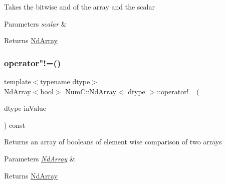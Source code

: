 Takes the bitwise and of the array and the scalar


\begin{DoxyParams}{Parameters}
{\em scalar} & \\
\hline
\end{DoxyParams}
\begin{DoxyReturn}{Returns}
\mbox{\hyperlink{class_num_c_1_1_nd_array}{Nd\+Array}} 
\end{DoxyReturn}
\mbox{\label{class_num_c_1_1_nd_array_a5fb9a63456f79ce2e828d4228f66de5a}} 
\subsubsection{\texorpdfstring{operator"!=()}{operator!=()}\hspace{0.1cm}{\footnotesize\ttfamily [1/2]}}
{\footnotesize\ttfamily template$<$typename dtype$>$ \\
\mbox{\hyperlink{class_num_c_1_1_nd_array}{Nd\+Array}}$<$bool$>$ \mbox{\hyperlink{class_num_c_1_1_nd_array}{Num\+C\+::\+Nd\+Array}}$<$ dtype $>$\+::operator!= (\begin{DoxyParamCaption}\item[{dtype}]{in\+Value }\end{DoxyParamCaption}) const\hspace{0.3cm}{\ttfamily [inline]}}

Returns an array of booleans of element wise comparison of two arrays


\begin{DoxyParams}{Parameters}
{\em \mbox{\hyperlink{class_num_c_1_1_nd_array}{Nd\+Array}}} & \\
\hline
\end{DoxyParams}
\begin{DoxyReturn}{Returns}
\mbox{\hyperlink{class_num_c_1_1_nd_array}{Nd\+Array}} 
\end{DoxyReturn}
\mbox{\label{class_num_c_1_1_nd_array_a190298f1e71725ffb270d28eb08cacbf}} 
